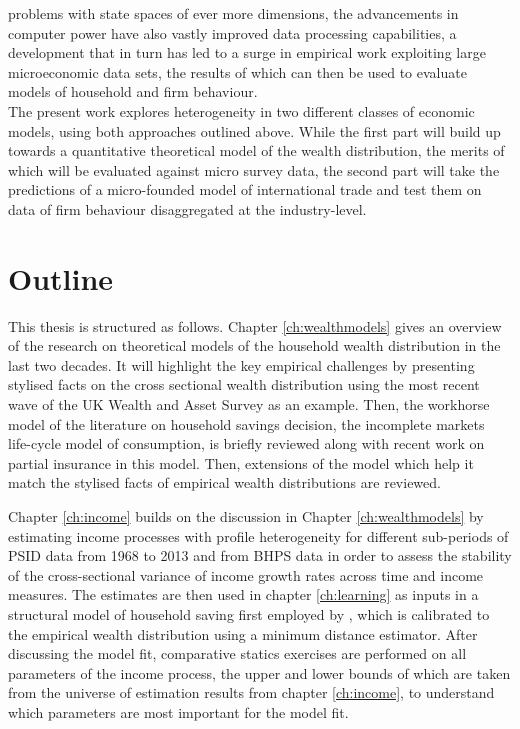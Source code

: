 problems with state spaces of ever more dimensions, the advancements in computer
power have also vastly improved data processing capabilities, a development that
in turn has led to a surge in empirical work exploiting large microeconomic data
sets, the results of which can then be used to evaluate models of household
and firm behaviour. \\
The present work explores heterogeneity in two different classes of economic models,
using both approaches outlined above. While the first part will build up towards
a quantitative theoretical model of the wealth distribution, the merits of which
will be evaluated against micro survey data, the second part will take the predictions
of a micro-founded model of international trade and test them on data of firm 
behaviour disaggregated at the industry-level. 

\section{Outline}
This thesis is structured as follows. Chapter \ref{ch:wealthmodels} gives an overview of the research 
on theoretical models of the household wealth distribution in the last two decades. 
It will highlight the key empirical challenges by presenting stylised facts on 
the cross sectional wealth distribution using the most recent wave of the UK
Wealth and Asset Survey as an example. Then, the workhorse model of the literature
on household savings decision, the incomplete markets life-cycle model of consumption,
is briefly reviewed along with recent work on partial insurance in this model. 
Then, extensions of the model which help it match the stylised facts of empirical
wealth distributions are reviewed.

Chapter \ref{ch:income} builds on the discussion in Chapter \ref{ch:wealthmodels} 
by estimating income processes with profile heterogeneity for different sub-periods 
of PSID data from 1968 to 2013 and from BHPS 
data in order to assess the stability of the cross-sectional variance of income 
growth rates across time and income measures. The estimates are then used
in chapter \ref{ch:learning} as inputs 
in a structural model of household saving first employed by \citet{Guvenen2007}, 
which is calibrated to the empirical wealth distribution using a minimum distance
estimator. After discussing the model fit, comparative statics exercises are 
performed on all parameters of the income process, the upper and lower bounds of
which are taken from the universe of estimation results from chapter \ref{ch:income},
to understand which parameters are most important for the model fit. 

